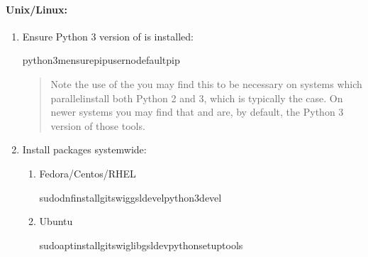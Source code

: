 \documentclass[letterpaper,10pt,english,openany,oneside]{sphinxmanual}
\begin{document}
\paragraph{Unix/Linux:}
\label{\detokenize{docs/guide-chapter-contributing:unix-linux}}\begin{enumerate}
%
\item {} 
\sphinxAtStartPar
Ensure Python 3 version of  is installed:

\begin{sphinxVerbatim}[commandchars=\\\{\}]
python3\PYGZhy{}mensurepip\PYGZhy{}\PYGZhy{}user\PYGZhy{}\PYGZhy{}no\PYGZhy{}default\PYGZhy{}pip
\end{sphinxVerbatim}
\begin{quote}

\sphinxAtStartPar
Note the use of the  \sphinxhyphen{} you may find this to be
necessary on systems which parallel\sphinxhyphen{}install both Python 2 and 3,
which is typically the case. On newer systems you may find that
 and  are, by default, the Python 3 version of
those tools.
\end{quote}

\item {} 
\sphinxAtStartPar
Install packages system\sphinxhyphen{}wide:
\begin{enumerate}
%
\item {} 
\sphinxAtStartPar
Fedora/Centos/RHEL

\begin{sphinxVerbatim}[commandchars=\\\{\}]
sudodnfinstallgitswiggsl\PYGZhy{}develpython3\PYGZhy{}devel
\end{sphinxVerbatim}

\item {} 
\sphinxAtStartPar
Ubuntu

\begin{sphinxVerbatim}[commandchars=\\\{\}]
sudoaptinstallgitswiglibgsl\PYGZhy{}devpython\PYGZhy{}setuptools
\end{sphinxVerbatim}

\end{enumerate}

\end{enumerate}
\end{document}
